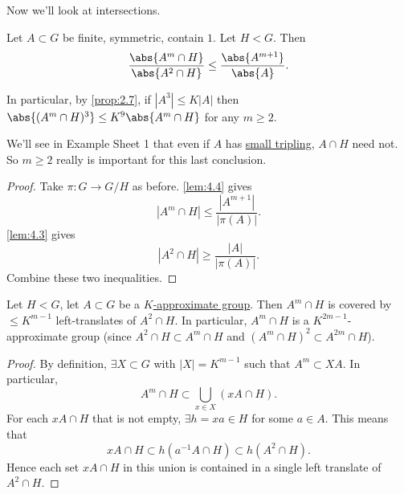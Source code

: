 \documentclass{article}
\newcommand{\ratio}[2]{\frac{\abs{#1}}{\abs{#2}}}
\numberwithin{equation}{section}
\begin{document}
Now we'll look at intersections.
\begin{nprop}\label{prop:4.5}
  Let $A \subset G$ be finite, symmetric, contain $1$. Let $H < G$. Then
  \begin{equation*}
    \ratio{A^m \cap H}{A^2 \cap H} \leq \ratio{A^{m+1}}{A}.
  \end{equation*}
\end{nprop}
In particular, by \cref{prop:2.7}, if $|A^3| \leq K|A|$ then $\abs{(A^m \cap H)^3} \leq K^9 \abs{A^m \cap H}$ for any $m \geq 2$.
\begin{remark}
  We'll see in Example Sheet 1 that even if $A$ has \hyperlink{def:tripling}{small tripling}, $A \cap H$ need not.
  So $m \geq 2$ really is important for this last conclusion.
\end{remark}
\begin{proof}
  Take $\pi: G \to G/H$ as before. \cref{lem:4.4} gives
  \begin{equation*}|A^m \cap H|  \leq \frac{|A^{m+1}|}{|\pi(A)|}.\end{equation*}
  \cref{lem:4.3} gives
  \begin{equation*}|A^2 \cap H| \geq \frac{|A|}{|\pi(A)|}.\end{equation*}
  Combine these two inequalities.
\end{proof}
\begin{nprop}\label{prop:4.6}
  Let $H < G$, let $A \subset G$ be a \hyperlink{def:appGroup}{$K$-approximate group}. Then $A^m \cap H$ is covered by $\leq K^{m-1}$ left-translates of $A^2 \cap H$.
  In particular, $A^m \cap H$ is a $K^{2m-1}$-approximate group (since $A^2 \cap H \subset A^m \cap H$ and $(A^m \cap H)^2 \subset A^{2m} \cap H$).
\end{nprop}
\begin{proof}
  By definition, $\exists X \subset G$ with $|X| = K^{m-1}$ such that $A^m \subset XA$. In particular,
  \begin{equation*}
    A^m \cap H \subset \bigcup_{x \in X} (xA \cap H).
  \end{equation*}
  For each $xA \cap H$ that is not empty, $\exists h = xa \in H$ for some $a \in A$.
  This means that
  \begin{equation*}xA \cap H \subset h(a^{-1} A \cap H) \subset h(A^2 \cap H).\end{equation*}
  Hence each set $xA \cap H$ in this union is contained in a single left translate of $A^2 \cap H$.
\end{proof}
\end{document}
